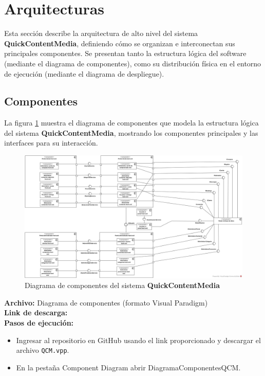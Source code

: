 \section{Arquitecturas}
Esta sección describe la arquitectura de alto nivel del sistema \textbf{QuickContentMedia}, definiendo cómo se organizan e interconectan sus principales componentes. Se presentan tanto la estructura lógica del software (mediante el diagrama de componentes), como su distribución física en el entorno de ejecución (mediante el diagrama de despliegue).

\subsection{Componentes}

La figura \ref{DiagComp} muestra el diagrama de componentes que modela la estructura lógica del sistema \textbf{QuickContentMedia}, mostrando los componentes principales y las interfaces para su interacción.

\begin{figure}[H]
    \centering
    \includegraphics[width=0.95\linewidth]{Media/4_Disenio/componentes.jpg}
    \caption{Diagrama de componentes del sistema \textbf{QuickContentMedia}}
    \label{DiagComp}
\end{figure}

\textbf{Archivo:} Diagrama de componentes (formato Visual Paradigm) \\
\textbf{Link de descarga:} \linkDiagramaComponentes \\

\textbf{Pasos de ejecución:}
\begin{itemize}
    \item Ingresar al repositorio en GitHub usando el link proporcionado y descargar el archivo \texttt{QCM.vpp}.
    \item En la pestaña Component Diagram abrir DiagramaComponentesQCM.
\end{itemize}

